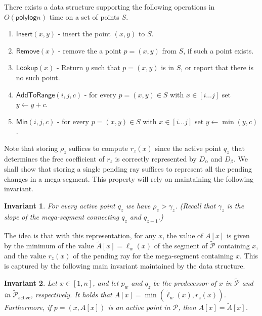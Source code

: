 \documentclass[a4paper,UKenglish,cleveref, autoref, thm-restate]{lipics-v2021}
\newcommand{\AtR}{\mathsf{AddToRange}}
\newcommand{\assign}{\leftarrow}
\newcommand{\local}{\text{short }}
\newcommand{\addmin}{\text{Add-min }}
\newcommand{\Insert}{\mathsf{Insert}}
\newcommand{\Remove}{\mathsf{Remove}}
\newcommand{\Lookup}{\mathsf{Lookup}}
\newcommand{\Min}{\mathsf{Min}}
\renewcommand{\P}{\mathcal{P}}
\newcommand{\TAP}{\tilde{\P}_{\mathsf{active}}}
\newcommand{\TA}{\tilde{A}}
\newcommand{\tell}{\tilde{\ell}}
\newcommand{\TP}{\tilde{\P}}
\newcommand{\ray}{r}
\newcommand{\rl}[1]{\rho_{#1}}
\newcommand{\polylog}{\mathsf{polylog}}
\newtheorem{invariant}{Invariant}
\begin{document}
\begin{lemma}[\addmin Data Structure]\label{lem:addminds}
      There exists a data structure supporting the following operations in $O(\polylog n)$ time on a set of points $S$. 
    \begin{enumerate}
        \item $\Insert(x,y)$ - insert the point $(x,y)$ to $S$.
        \item $\Remove(x)$ - remove the a point $p=(x,y)$ from $S$, if such a point exists.
        \item $\Lookup(x)$ - Return $y$ such that $p=(x,y)$ is in $S$, or report that there is no such point.
        \item $\AtR(i,j,c)$ - for every $p=(x,y)\in S$ with $x\in[i\ldots j]$ set $y\assign y +c$. 
        \item $\Min(i,j,c)$ - for every $p=(x,y)\in S$ with $x\in[i\ldots j]$ set $y \assign \min (y ,c)$. 
    \end{enumerate}
    \end{lemma}
    
Note that storing $\rl{z}$ suffices to compute $\ray_z(x)$ since the active point $q_z$ that determines the free coefficient of $\ray_z$ is correctly represented by $D_\alpha$ and $D_\beta$.  
We shall show that storing a single pending ray suffices to represent all the pending changes in a mega-segment. This property will rely on maintaining the following invariant.
\begin{invariant}\label{inv:rr_rl}
    For every active point $q_z$ we have $\rl{z}>\gamma_z$. (Recall that $\gamma_z$ is the slope of the mega-segment connecting $q_z$ and $q_{z+1}$.)
\end{invariant}

The idea is that with this representation, for any $x$, the value of $A[x]$ is given by the minimum of the value $\TA[x] = \ell_w(x)$ of the segment of $\TP$ containing $x$, and the value $\ray_z(x)$ of the pending \local ray for the mega-segment containing $x$. This is captured by the following main invariant maintained by the data structure.

\begin{invariant}\label{inv:lazyrs}
Let $x \in [1,n]$, and let $p_w$ and $q_z$ be the predecessor of $x$ in $\TP$ and in $\TAP$, respectively. 
It holds that $A[x] = \min (\tell_w(x), \ray_z(x))$. Furthermore, if $p=(x,A[x])$ is an active point in $\P$, then $A[x] = \TA[x]$.
\end{invariant}
\end{document}
